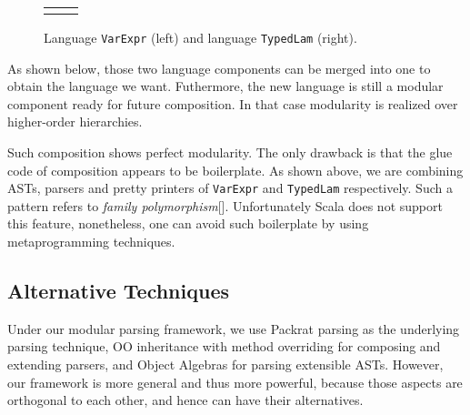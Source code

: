 \begin{figure}[t]
\begin{tabular}{m{0.42\linewidth}m{0.52\linewidth}}
&
\end{tabular}
\caption{Language \lstinline{VarExpr} (left) and language \lstinline{TypedLam} (right).}\label{fig:lng-components}
\end{figure}

As shown below, those two language components can be merged into one to obtain the language we want. Futhermore, the new language is still a modular
component ready for future composition. In that case modularity is realized over higher-order hierarchies.

Such composition shows perfect modularity. The only
drawback is that the glue code of composition appears to be boilerplate. As shown above, we are combining ASTs, parsers and pretty printers of
\lstinline{VarExpr} and \lstinline{TypedLam} respectively. Such a pattern refers to \textit{family polymorphism}[]. Unfortunately Scala does not
support this feature, nonetheless, one can avoid such boilerplate by using metaprogramming techniques.

\subsection{Alternative Techniques}

Under our modular parsing framework, we use Packrat parsing as the underlying parsing technique, OO inheritance with method overriding for composing and extending parsers, and Object Algebras for parsing extensible ASTs. However, our framework is more general and thus more powerful, because those aspects are orthogonal to each other, and hence can have their alternatives.

